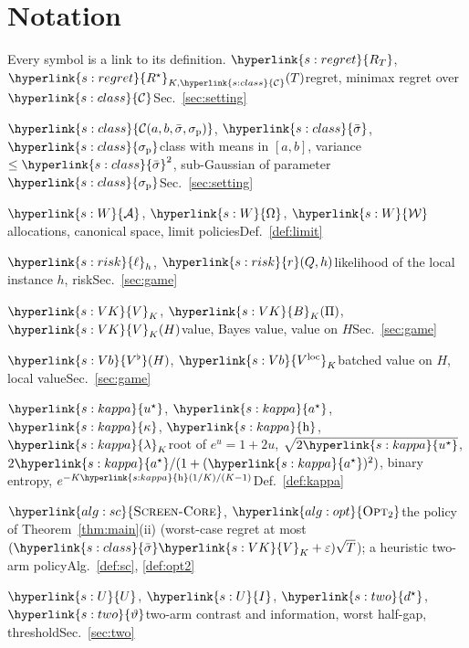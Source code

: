 \documentclass[11pt]{article}
\DeclareRobustCommand{\sy}[2]{{\hyperlink{#1}{#2}}}
\newcommand{\1}{\mathbf{1}}
\newcommand{\RT}{\sy{s:regret}{R_T}}
\newcommand{\Rs}{\sy{s:regret}{R^\star}}
\newcommand{\Cl}{\sy{s:class}{\mathcal C}}
\newcommand{\Cab}{\sy{s:class}{\mathcal C(a,b,\bar\sigma,\sigma_{\mathrm p})}}
\newcommand{\sbar}{\sy{s:class}{\bar\sigma}}
\newcommand{\sigp}{\sy{s:class}{\sigma_{\mathrm p}}}
\newcommand{\Wc}{\sy{s:W}{\mathcal W}}
\newcommand{\Om}{\sy{s:W}{\Omega}}
\newcommand{\Al}{\sy{s:W}{\mathcal A}}
\newcommand{\rk}{\sy{s:risk}{r}}
\newcommand{\lh}{\sy{s:risk}{\ell}}
\newcommand{\VK}{\sy{s:VK}{V}}
\newcommand{\BK}{\sy{s:VK}{B}}
\newcommand{\Vb}{\sy{s:Vb}{V^\flat}}
\newcommand{\Vloc}{\sy{s:Vb}{V^{\mathrm{loc}}}}
\newcommand{\us}{\sy{s:kappa}{u^\star}}
\newcommand{\as}{\sy{s:kappa}{a^\star}}
\newcommand{\kap}{\sy{s:kappa}{\kappa}}
\newcommand{\hb}{\sy{s:kappa}{\mathrm h}}
\newcommand{\lamK}{\sy{s:kappa}{\lambda}}
\newcommand{\SC}{\sy{alg:sc}{\textsc{Screen-Core}}}
\newcommand{\OPT}{\sy{alg:opt}{\textsc{Opt}\textsubscript{2}}}
\newcommand{\Ud}{\sy{s:U}{U}}
\newcommand{\Id}{\sy{s:U}{I}}
\newcommand{\dst}{\sy{s:two}{d^\star}}
\newcommand{\thr}{\sy{s:two}{\vartheta}}
\begin{document}
\section{Notation}\label{sec:notation}
Every symbol is a link to its definition.
\noindent $\RT$, $\Rs_{K,\Cl}(T)$\quad regret, minimax regret over $\Cl$\hfill{\small Sec.~\ref{sec:setting}}\par
\noindent $\Cab$, $\sbar$, $\sigp$\quad class with means in $[a,b]$, variance $\le\sbar^2$, sub-Gaussian of parameter $\sigp$\hfill{\small Sec.~\ref{sec:setting}}\par
\noindent $\Al$, $\Om$, $\Wc$\quad allocations, canonical space, limit policies\hfill{\small Def.~\ref{def:limit}}\par
\noindent $\lh_h$, $\rk(Q,h)$\quad likelihood of the local instance $h$, risk\hfill{\small Sec.~\ref{sec:game}}\par
\noindent $\VK_K$, $\BK_K(\Pi)$, $\VK_K(H)$\quad value, Bayes value, value on $H$\hfill{\small Sec.~\ref{sec:game}}\par
\noindent $\Vb(H)$, $\Vloc_K$\quad batched value on $H$, local value\hfill{\small Sec.~\ref{sec:game}}\par
\noindent $\us$, $\as$, $\kap$, $\hb$, $\lamK_K$\quad root of $e^u=1+2u$, $\sqrt{2\us}$, $2\as/(1+(\as)^2)$, binary entropy, $e^{-K\hb(1/K)/(K-1)}$\hfill{\small Def.~\ref{def:kappa}}\par
\noindent $\SC$, $\OPT$\quad the policy of Theorem~\ref{thm:main}(ii) (worst-case regret at most $(\sbar\VK_K+\varepsilon)\sqrt T$); a heuristic two-arm policy\hfill{\small Alg.~\ref{def:sc}, \ref{def:opt2}}\par
\noindent $\Ud$, $\Id$, $\dst$, $\thr$\quad two-arm contrast and information, worst half-gap, threshold\hfill{\small Sec.~\ref{sec:two}}\par




\end{document}
